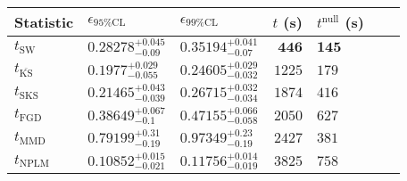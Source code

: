 \begin{tabular}{l|llr|llr}
Statistic & $\epsilon_{95\%\mathrm{CL}}$ & $\epsilon_{99\%\mathrm{CL}}$ & $t$ (s) & $t^{\mathrm{null}}$ (s) \\
	\midrule
	$t_{\mathrm{SW}}$ & $0.28278_{-0.09}^{+0.045}$ & $0.35194_{-0.07}^{+0.041}$ & ${\mathbf{446}}$ & ${\mathbf{145}}$ \\
	$t_{\overline{\mathrm{KS}}}$ & ${\mathbf{0.1977_{-0.055}^{+0.029}}}$ & ${\mathbf{0.24605_{-0.032}^{+0.029}}}$ & $1225$ & $179$ \\
	$t_{\mathrm{SKS}}$ & $0.21465_{-0.039}^{+0.043}$ & $0.26715_{-0.034}^{+0.032}$ & $1874$ & $416$ \\
	$t_{\mathrm{FGD}}$ & $0.38649_{-0.1}^{+0.067}$ & $0.47155_{-0.058}^{+0.066}$ & $2050$ & $627$ \\
	$t_{\mathrm{MMD}}$ & $0.79199_{-0.19}^{+0.31}$ & $0.97349_{-0.19}^{+0.23}$ & $2427$ & $381$ \\
\rowcolor{red!35}	$t_{\mathrm{NPLM}}$ & $0.10852_{-0.021}^{+0.015}$ & $0.11756_{-0.019}^{+0.014}$ & $3825$ & $758$ \\
	\bottomrule
\end{tabular}